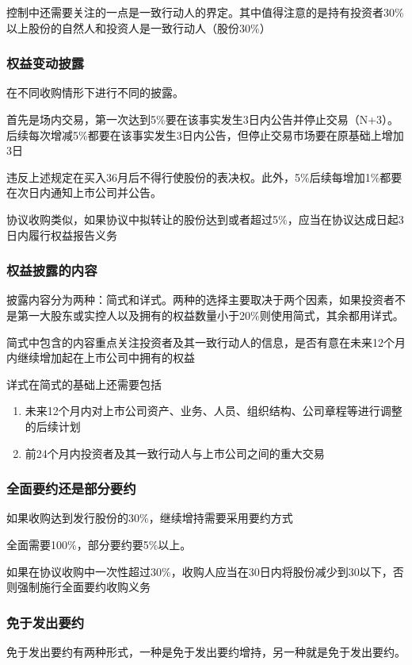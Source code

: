 \documentclass[UTF8,12pt]{ctexart}
\numberwithin{equation}{section} %
\numberwithin{figure}{section}
\numberwithin{table}{section}
\begin{document}
	控制中还需要关注的一点是一致行动人的界定。其中值得注意的是持有投资者30\%以上股份的自然人和投资人是一致行动人（股份30\%）
	
	\subsubsection{权益变动披露}
	在不同收购情形下进行不同的披露。
	
	首先是场内交易，第一次达到5\%要在该事实发生3日内公告并停止交易（N+3）。后续每次增减5\%都要在该事实发生3日内公告，但停止交易市场要在原基础上增加3日
	
	违反上述规定在买入36月后不得行使股份的表决权。此外，5\%后续每增加1\%都要在次日内通知上市公司并公告。
	
	协议收购类似，如果协议中拟转让的股份达到或者超过5\%，应当在协议达成日起3日内履行权益报告义务
	
	\subsubsection{权益披露的内容}
	披露内容分为两种：简式和详式。两种的选择主要取决于两个因素，如果投资者不是第一大股东或实控人以及拥有的权益数量小于20\%则使用简式，其余都用详式。
	
	简式中包含的内容重点关注投资者及其一致行动人的信息，是否有意在未来12个月内继续增加起在上市公司中拥有的权益
	
	详式在简式的基础上还需要包括
	\begin{enumerate}
		\item 未来12个月内对上市公司资产、业务、人员、组织结构、公司章程等进行调整的后续计划
		
		\item 前24个月内投资者及其一致行动人与上市公司之间的重大交易
	\end{enumerate}
	
	\subsubsection{全面要约还是部分要约}
	如果收购达到发行股份的30\%，继续增持需要采用要约方式
	
	全面需要100\%，部分要约要5\%以上。
	
	如果在协议收购中一次性超过30\%，收购人应当在30日内将股份减少到30以下，否则强制施行全面要约收购义务
	
	\subsubsection{免于发出要约}
	免于发出要约有两种形式，一种是免于发出要约增持，另一种就是免于发出要约。
	
\end{document}
